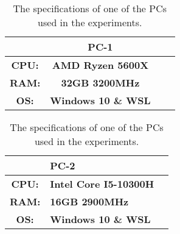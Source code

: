 
\begin{table}[htb!]
    \centering
    \begin{tabular}{ccp{}p{}}
        \toprule
        \textbf{} & \textbf{PC-1} \\
        \midrule
        \textbf{CPU:} & \textbf{AMD Ryzen 5600X} \\
        \textbf{RAM:} & \textbf{32GB 3200MHz} \\
        \textbf{OS:} & \textbf{Windows 10 \& WSL} \\
        \bottomrule
    \end{tabular}
    \caption{The specifications of one of the PCs used in the experiments.}
    \label{tab:pc1-specs}
\end{table}

\begin{table}[htb!]
    \centering
    \begin{tabular}{cp{}p{}}
        \toprule
        \textbf{} & \textbf{PC-2} \\
        \midrule
        \textbf{CPU:} & \textbf{Intel Core I5-10300H} \\
        \textbf{RAM:} & \textbf{16GB 2900MHz} \\
        \textbf{OS:} & \textbf{Windows 10 \& WSL} \\
        \bottomrule
    \end{tabular}
    \caption{The specifications of one of the PCs used in the experiments.}
    \label{tab:pc2-specs}
\end{table}

